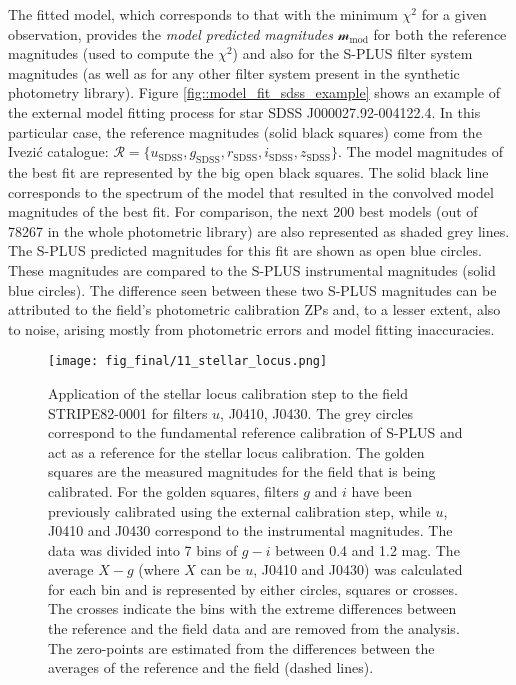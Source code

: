 \documentclass[fleqn,usenatbib]{mnras}
\begin{document}
The fitted model, which corresponds to that with the minimum $\chi^2$ for a given observation, provides the \textit{model predicted magnitudes} $\mathcal{m}_\mathrm{mod}$ for both the reference magnitudes (used to compute the $\chi^2$) and also for the S-PLUS filter system magnitudes (as well as for any other filter system present in the synthetic photometry library). Figure \ref{fig::model_fit_sdss_example} shows an example of the external model fitting process for star SDSS J000027.92-004122.4. In this particular case, the reference magnitudes (solid black squares) come from the Ivezi{\'c} catalogue: $\mathscr{R} = \{u_\mathrm{SDSS}, g_\mathrm{SDSS}, r_\mathrm{SDSS}, i_\mathrm{SDSS}, z_\mathrm{SDSS}  \}$. The model magnitudes of the best fit are represented by the big open black squares. The solid black line corresponds to the spectrum of the model that resulted in the convolved model magnitudes of the best fit. For comparison, the next 200 best models (out of 78267 in the whole photometric library) are also represented as shaded grey lines. The S-PLUS predicted magnitudes for this fit are shown as open blue circles. These magnitudes are compared to the S-PLUS instrumental magnitudes (solid blue circles). The difference seen between these two S-PLUS magnitudes can be attributed to the field's photometric calibration ZPs and, to a lesser extent, also to noise, arising mostly from photometric errors and model fitting inaccuracies.

\begin{figure}
\begin{center}
\texttt{[image: fig\_final/11\_stellar\_locus.png]}
\caption{\label{fig:stellar_locus_ex} Application of the stellar locus calibration step to the field STRIPE82-0001 for filters $u$, J0410, J0430. The grey circles correspond to the fundamental reference calibration of S-PLUS and act as a reference for the stellar locus calibration. The golden squares are the measured magnitudes for the field that is being calibrated. For the golden squares, filters $g$ and $i$ have been previously calibrated using the external calibration step, while $u$, J0410 and J0430 correspond to the instrumental magnitudes. The data was divided into 7 bins of $g-i$ between 0.4 and 1.2 mag. The average $X - g$ (where $X$ can be $u$, J0410 and J0430) was calculated for each bin and is represented by either circles, squares or crosses. The crosses indicate the bins with the extreme differences between the reference and the field data and are removed from the analysis. The zero-points are estimated from the differences between the averages of the reference and the field (dashed lines).}
\end{center}
\end{figure}
\end{document}
